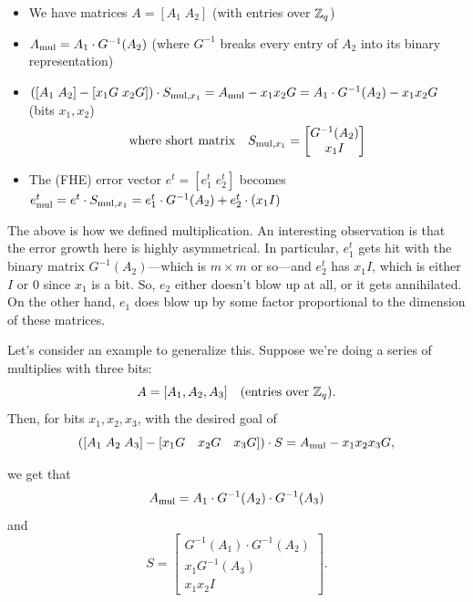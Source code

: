 \documentclass[11pt]{article}
\begin{document}
\begin{itemize}
    \item We have matrices $A=[A_1 \; A_2]$ \quad (with entries over $\mathbb{Z}_q$)
    \item $A_{\textmd{mul}} = A_1 \cdot G^{-1}(A_2)$ \quad (where $G^{-1}$ breaks every entry of $A_2$ into its binary representation)
    
    \item $\left([A_1 \; A_2] - \left[x_1G \; x_2G\right]\right) \cdot S_{\textmd{mul},x_1} = A_{\textmd{mul}} - x_1x_2G = A_1\cdot G^{-1}(A_2) - x_1x_2G$ \quad (bits $x_1,x_2$)
    $$\textmd{where short matrix}\quad S_{\textmd{mul},x_1} = \begin{bmatrix}
        G^{-1}(A_2) \\
        x_1I
    \end{bmatrix}$$
    \item The (FHE) error vector $e^t=[e_1^t \; e_2^t]$ becomes $e^t_{\textmd{mul}} = e^t \cdot S_{\textmd{mul},x_1} = e_1^t\cdot G^{-1}(A_2)+e_2^t\cdot (x_1I)$
    
\end{itemize}

The above is how we defined multiplication. An interesting observation is that the error growth here is highly asymmetrical. In particular, $e_1^t$ gets hit with the binary matrix $G^{-1}(A_2)$---which is $m\times m$ or so---and $e_2^t$ has $x_1I$, which is either $I$ or $0$ since $x_1$ is a bit. So, $e_2$ either doesn't blow up at all, or it gets annihilated. On the other hand, $e_1$ does blow up by some factor proportional to the dimension of these matrices.


Let's consider an example to generalize this. Suppose we're doing a series of multiplies with three bits:
$$A=[A_1,A_2,A_3] \quad \textmd{(entries over } \mathbb{Z}_q \textmd{).}$$
Then, for bits $x_1,x_2,x_3$, with the desired goal of
\begin{equation}
    \label{eq:3-bit-mul-cond}
    \left([A_1 \; A_2 \; A_3] - [x_1G \quad x_2G \quad x_3G]\right) \cdot S = A_{\textmd{mul}} - x_1x_2x_3G,
\end{equation}

\noindent we get that
$$A_{\textmd{mul}} = A_1\cdot G^{-1}(A_2) \cdot G^{-1}(A_3)$$
\noindent and
$$S = \begin{bmatrix}
    G^{-1}(A_1) \cdot G^{-1}(A_2) \\
    x_1 G^{-1}(A_3) \\
    x_1x_2I
\end{bmatrix}.$$
\end{document}
